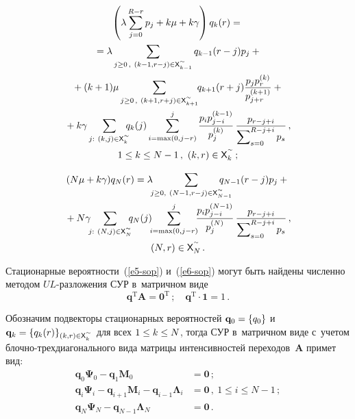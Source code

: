 \begin{multicols}{2}
\noindent
\begin{multline*}
\left( \lambda\sum\limits_{j=0}^{R-r} p_j +k\mu +k\gamma\right) q_k(r) 
={}\\
{}=\lambda \sum\limits_{j\geq 0\,,\ (k-1,r-j)\in {\sf X}^{\sptilde}_{k-1}} q_{k-1}(r-j) 
p_j+{}\\
{}+ (k+1) \mu \sum\limits_{j\geq0\,,\ (k+1, r+j)\in {\sf X}_{k+1}^{\sptilde}} \hspace*{-1mm}
q_{k+1}(r+j)\fr{p_j p_r^{(k)}}{p_{j+r}^{(k+1)}}+{}\\
{}+k\gamma \sum\limits_{j:\ (k,j)\in {\sf X}_k^{\sptilde}}\hspace*{-6pt} q_k(j) 
\sum\limits^j_{i=\max(0,j-r)} \fr{p_i p_{j-i}^{(k-1)}}{p_j^{(k)}}\, 
\fr{p_{r-j+i}} 
{\sum\nolimits_{s=0}^{R-j+i} p_s}\,,\\ 1\leq k\leq N-1\,,\ (k,r)\in {\sf 
X}_k^{\sptilde}\,;
\end{multline*}

\vspace*{-12pt}

\noindent
\begin{multline*}
(N\mu+k\gamma)q_N(r)=\lambda\hspace*{-4pt}\sum\limits_{j\geq0,\ (N-1,r-j)\in {\sf 
X}^{\sptilde}_{N-1}} \hspace*{-15pt}q_{N-1}(r-j) p_j+{}\\
{}+N\gamma\hspace*{-4pt}\sum\limits_{j:\ (N,j)\in {\sf X}^{\sptilde}_N} \hspace*{-5pt}q_N(j) 
\hspace*{-4pt}\sum\limits^j_{i=\max(0,j-r)}\hspace*{-4pt} \fr{p_i p_{j-i}^{(N-1)}}{p_j^{(N)}}\, 
\fr{p_{r-j+i}}{\sum\nolimits_{s=0}^{R-j+i} p_s}\,,\\
(N,r)\in {\sf X}_N^{\sptilde}\,.
\end{multline*}
  
  Стационарные вероятности~(\ref{e5-sop}) и~(\ref{e6-sop}) могут быть 
найдены численно методом $UL$-раз\-ло\-же\-ния СУР в~матричном виде 
$$
\mathbf{q}^{\mathrm{T}}\mathbf{A}=\mathbf{0}^{\mathrm{T}}\,;
\quad
\mathbf{q}^{\mathrm{T}}\cdot \mathbf{1}=1\,.
$$

 Обозначим подвекторы 
стационарных вероятностей $\mathbf{q}_0\hm=\{q_0\}$ и~$\mathbf{q}_k\hm= 
\{q_k(r)\}_{(k,r)\in {\sf X}_k^{\sptilde}}$ для всех $1\hm\leq k \leq N$, тогда СУР 
в~матричном виде с~учетом блоч\-но-трех\-диа\-го\-наль\-но\-го вида матрицы 
интенсивностей переходов~$\mathbf{A}$ примет вид:
  \begin{align}
  \!\!\!\mathbf{q}_0\boldsymbol{\Psi}_0-\mathbf{q}_1\mathbf{M}_0&=\mathbf{0}\,; 
\label{e10-sop}\\
   \!\!\! \mathbf{q}_i\boldsymbol{\Psi}_i -\mathbf{q}_{i+1}\mathbf{M}_i- 
\mathbf{q}_{i-1}\boldsymbol{\Lambda}_i&=\mathbf{0}\,,\ 1\leq i\leq N-1\,;
  \label{e11-sop}\\
    \!\!\!\mathbf{q}_N \boldsymbol{\Psi}_N -\mathbf{q}_{N-1} 
\boldsymbol{\Lambda}_N&= \mathbf{0}\,.\label{e12-sop}
  \end{align}
  

\end{multicols}

